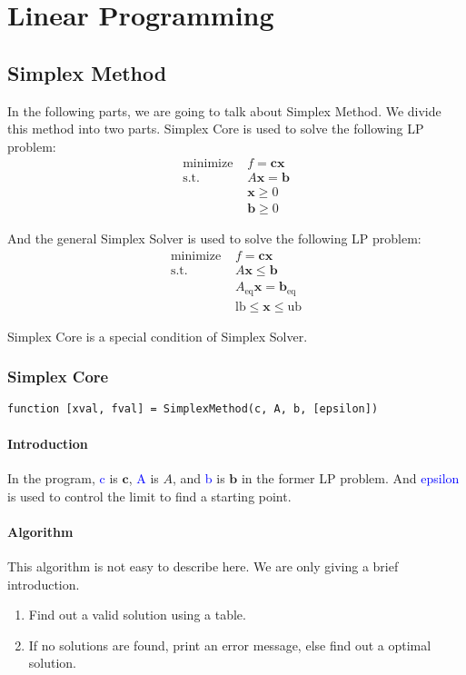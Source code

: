 \documentclass{article}
\begin{document}
\section{Linear Programming}
\subsection{Simplex Method}
In the following parts, we are going to talk about Simplex Method. We divide this method into two parts. Simplex Core is used to solve the following LP problem:
\begin{align*}
    \mbox{minimize } & f = \mathbf{c}\mathbf{x} \\
    \mbox{s.t. } & A\mathbf{x} = \mathbf{b} \\
                 & \mathbf{x} \geqslant 0 \\
                 & \mathbf{b} \geqslant 0
\end{align*}

And the general Simplex Solver is used to solve the following LP problem:
\begin{align*}
    \mbox{minimize } & f = \mathbf{c}\mathbf{x} \\
    \mbox{s.t. } & A\mathbf{x} \leqslant \mathbf{b} \\
                 & A_{\mbox{eq}} \mathbf{x} = \mathbf{b}_{\mbox{eq}} \\
                 & \mbox{lb} \leqslant \mathbf{x} \leqslant \mbox{ub}
\end{align*}

Simplex Core is a special condition of Simplex Solver.

\subsubsection{Simplex Core}
\begin{verbatim}
function [xval, fval] = SimplexMethod(c, A, b, [epsilon])    
\end{verbatim}
\paragraph{Introduction}
In the program, \textcolor{blue}{c} is $\mathbf{c}$, \textcolor{blue}{A} is $A$, and \textcolor{blue}{b} is $\mathbf{b}$ in the former LP problem. And \textcolor{blue}{epsilon} is used to control the limit to find a starting point.

\paragraph{Algorithm}
This algorithm is not easy to describe here. We are only giving a brief introduction.
\begin{enumerate}
    \item Find out a valid solution using a table.
    \item If no solutions are found, print an error message, else find out a optimal solution.
\end{enumerate}
\end{document}
